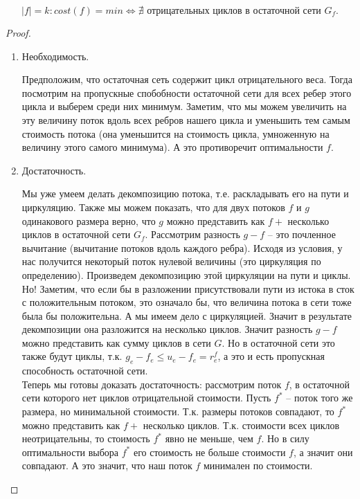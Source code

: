 \begin{lemma}
	\[ 
		|f| = k \colon cost(f) = min \Leftrightarrow \nexists \text{ отрицательных циклов в остаточной сети } G_f.	
	\]
\end{lemma}
\begin{proof}
	\begin{enumerate}
		\item Необходимость. 
		
		Предположим, что остаточная сеть содержит цикл отрицательного веса. Тогда посмотрим на пропускные спобобности остаточной сети для всех ребер этого цикла и выберем среди них минимум. 
		Заметим, что мы можем увеличить на эту величину поток вдоль всех ребров нашего цикла и уменьшить тем самым стоимость потока (она уменьшится на стоимость цикла, умноженную на величину этого самого минимума).
		А это противоречит оптимальности $f$.

		\item Достаточность. 
		
		Мы уже умеем делать декомпозицию потока, т.е. раскладывать его на пути и циркуляцию. Также мы можем показать, что для двух потоков $f$ и $g$ одинакового размера верно, что $g$ можно 
		представить как $f +$ несколько циклов в остаточной сети $G_f$. Рассмотрим разность $g - f$ -- это почленное вычитание (вычитание потоков вдоль каждого ребра). Исходя из условия, у нас получится некоторый
		поток нулевой величины (это циркуляция по определению). Произведем декомпозицию этой циркуляции на пути и циклы. Но! Заметим, что если бы в разложении присутствовали пути из истока в сток с положительным 
		потоком, это означало бы, что величина потока в сети тоже была бы положительна. А мы имеем дело с циркуляцией. Значит в результате декомпозиции она разложится на несколько циклов. Значит разность $g - f$ можно
		представить как сумму циклов в сети $G$. Но в остаточной сети это также будут циклы, т.к. $g_e - f_e \le u_e - f_e = r^f_e$, а это и есть пропускная способность остаточной сети.\\

		Теперь мы готовы доказать достаточность: рассмотрим поток $f$, в остаточной сети которого нет циклов отрицательной стоимости. Пусть $f^*$ -- поток того же размера, но минимальной стоимости. Т.к.
		размеры потоков совпадают, то $f^*$ можно представить как $f +$ несколько циклов. Т.к. стоимости всех циклов неотрицательны, то стоимость $f^*$ явно не меньше, чем $f$. Но в силу оптимальности выбора $f^*$
		его стоимость не больше стоимости $f$, а значит они совпадают. А это значит, что наш поток $f$ минимален по стоимости. 
	\end{enumerate}
\end{proof}

